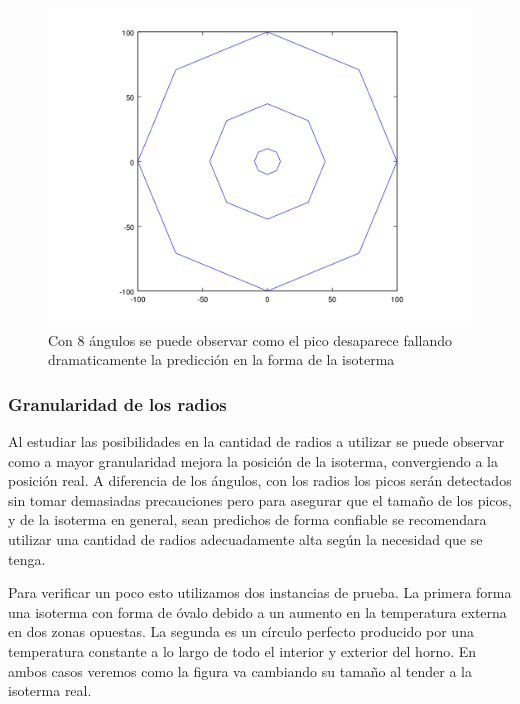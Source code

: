\begin{figure}[H]
\begin{minipage}{0.48\textwidth}   
  \centering
    \includegraphics[width=1\textwidth]{imgs/comp_angulos/comp_angs_iso4.png} 
  \caption{\footnotesize{Con 8 ángulos se puede observar como el pico desaparece fallando dramaticamente la predicción en la forma de la isoterma}}
  \label{fig:Experimento3}
\end{minipage}
\end{figure}

\subsubsection{Granularidad de los radios}
Al estudiar las posibilidades en la cantidad de radios a utilizar se puede observar como a mayor granularidad mejora la posición de la isoterma, convergiendo a la posición real. A diferencia de los ángulos, con los radios los picos serán detectados sin tomar demasiadas precauciones pero para asegurar que el tamaño de los picos, y de la isoterma en general, sean predichos de forma confiable se recomendara utilizar una cantidad de radios adecuadamente alta según la necesidad que se tenga.

Para verificar un poco esto utilizamos dos instancias de prueba. La primera forma una isoterma con forma de óvalo debido a un aumento en la temperatura externa en dos zonas opuestas. La segunda es un círculo perfecto producido por una temperatura constante a lo largo de todo el interior y exterior del horno. En ambos casos veremos como la figura va cambiando su tamaño al tender a la isoterma real.

